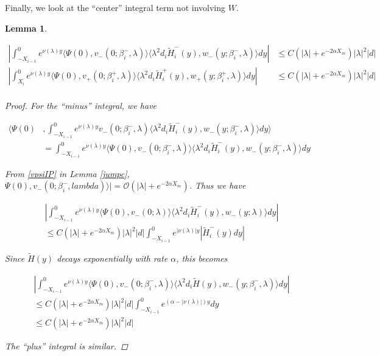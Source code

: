 \documentclass[12pt]{article}
\newtheorem{lemma}{Lemma}
\begin{document}

Finally, we look at the ``center'' integral term not involving $W$.

\begin{lemma}\label{centerH}

\begin{align*}
\left| \int_{-X_{i-1}}^0
e^{\nu(\lambda)y} \langle \Psi(0), v_-(0; \beta_i^-, \lambda) \rangle \langle \lambda^2 d_i \tilde{H}_i^-(y), w_-(y; \beta_i^-, \lambda) \rangle dy \right| &\leq C (|\lambda| + e^{-2 \alpha X_m} ) |\lambda|^2 |d|\\
\left| \int_{X_i}^0
e^{\nu(\lambda)y} \langle \Psi(0), v_+(0; \beta_i^+, \lambda) \rangle \langle \lambda^2 d_i \tilde{H}_i^+(y), w_+(y; \beta_i^+,\lambda) \rangle dy \right| &\leq C (|\lambda| + e^{-2 \alpha X_m} ) |\lambda|^2  |d| \\
\end{align*}

\begin{proof}

For the ``minus'' integral, we have

\begin{align*}
\langle \Psi(0) &, \int_{-X_{i-1}}^0
e^{\nu(\lambda)y} v_-(0; \beta_i^-, \lambda) \langle \lambda^2 d_i \tilde{H}_i^-(y), w_-(y; \beta_i^-, \lambda) \rangle dy \rangle \\
&= \int_{-X_{i-1}}^0
e^{\nu(\lambda)y} \langle \Psi(0), v_-(0; \beta_i^-, \lambda) \rangle \langle \lambda^2 d_i \tilde{H}_i^-(y), w_-(y; \beta_i^-, \lambda) \rangle dy 
\end{align*}

From \eqref{vpsiIP} in Lemma \ref{jumpc}, $\Psi(0), v_-(0; \beta_i^-, lambda) \rangle| = \mathcal{O}(|\lambda| + e^{-2 \alpha X_m})$. Thus we have

\begin{align*}
&\left| \int_{-X_{i-1}}^0
e^{\nu(\lambda)y} \langle \Psi(0), v_-(0; \lambda) \rangle \langle \lambda^2 d_i \tilde{H}_i^-(y), w_-(y; \lambda) \rangle dy \right| \\
&\leq C (|\lambda| + e^{-2 \alpha X_m} ) |\lambda|^2 |d| 
\int_{-X_{i-1}}^0 e^{|\nu(\lambda)|y} |\tilde{H}_i^-(y) dy|
\end{align*}

Since $\tilde{H}(y)$ decays exponentially with rate $\alpha$, this becomes

\begin{align*}
&\left| \int_{-X_{i-1}}^0
e^{\nu(\lambda)y} \langle \Psi(0), v_-(0; \beta_i^-, \lambda) \rangle \langle \lambda^2 d_i \tilde{H}(y), w_-(y; \beta_i^-, \lambda) \rangle dy \right| \\
&\leq C (|\lambda| + e^{-2 \alpha X_m}) |\lambda|^2  |d| 
\int_{-X_{i-1}}^0 e^{(\alpha - |\nu(\lambda)|)y} dy \\
&\leq C (|\lambda| + e^{-2 \alpha X_m}) |\lambda|^2  |d|
\end{align*}

The ``plus'' integral is similar.

\end{proof} 
\end{lemma}
\end{document}
